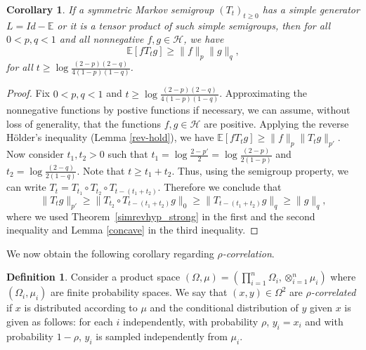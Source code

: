 \documentclass[11pt]{amsart}
\newcommand{\E}{\mathbb{E}}
\newcommand{\1}{\mathbf{1}}
\def\E{{\mathbb E}}
\def\H{{\mathcal{H}}}
\theoremstyle{definition}
\newtheorem{definition}[example]{Definition}
\theoremstyle{plain}
\newtheorem{corollary}[example]{Corollary}
\theoremstyle{remark}
\newtheorem{remark}[example]{Remark}
\numberwithin{equation}{section}
\begin{document}
\begin{corollary}\label{cor:two_function}
If a symmetric Markov semigroup $(T_{t})_{t \geq 0}$ has a simple generator $L=Id-\E$ or it is a tensor product of such simple semigroups, then for all $0 <p, q<1$ and all nonnegative
$f, g \in \H$, we have
\begin{equation} \label{ineq:two_function}
\E [f T_t g] \ge \|f \|_p \|g \|_q,
\end{equation}
for all $t \geq \log \frac{(2-p)(2-q)}{4(1-p)(1-q)}$.
\end{corollary}
\begin{proof} Fix $0 <p, q<1$ and $t \geq \log \frac{(2-p)(2-q)}{4(1-p)(1-q)}$. Approximating the nonnegative functions by postive functions if necessary, we can assume, without loss of generality, that  the functions $f, g \in \H$ are positive.
Applying the reverse H\"{o}lder's inequality (Lemma \ref{rev-hold}), we have $\E [f T_t g] \ge \|f \|_p \|T_t g \|_{p'}$.
Now consider $t_1, t_2 >0 $ such that $t_1 = \log \frac{2-p'}{2}  = \log \frac{(2-p)}{2(1-p)}  $ and $t_2 =  \log \frac{(2-q)}{2(1-q)}$. Note that $t \ge t_1 +t_2$. Thus, using the semigroup property, we can write  $T_t  = T_{t_1} \circ T_{t_2} \circ T_{t - (t_1+t_2)}$. Therefore we conclude that
\[ \| T_t g \|_{p'} \ge \|T_{t_2} \circ T_{t - (t_1+t_2)} g \|_{0}  \ge  \| T_{t - (t_1+t_2)} g \|_{q}   \ge \| g \|_{q},  \]
where  we used Theorem~\ref{simrevhyp_strong} in the first and the second inequality and Lemma \ref{concave} in the third inequality.
\end{proof}

We now obtain the following corollary regarding {\em $\rho$-correlation}.
\begin{definition} \label{d:rho_corr}
Consider a product space
$(\Omega, \mu) = (\prod_{i=1}^n \Omega_i, \otimes_{i=1}^n \mu_i)$ where $(\Omega_i, \mu_i)$ are finite probability spaces. We say that $(x,y) \in \Omega^2$ are {\em $\rho$-correlated} if $x$ is distributed according to $\mu$ and  the conditional distribution of $y$ given $x$ is given as follows:
for each $i$ independently, with probability $\rho$, $y_i = x_i$ and with probability $1-\rho$, $y_i$ is sampled independently from
$\mu_i$.
\end{definition}
\end{document}
